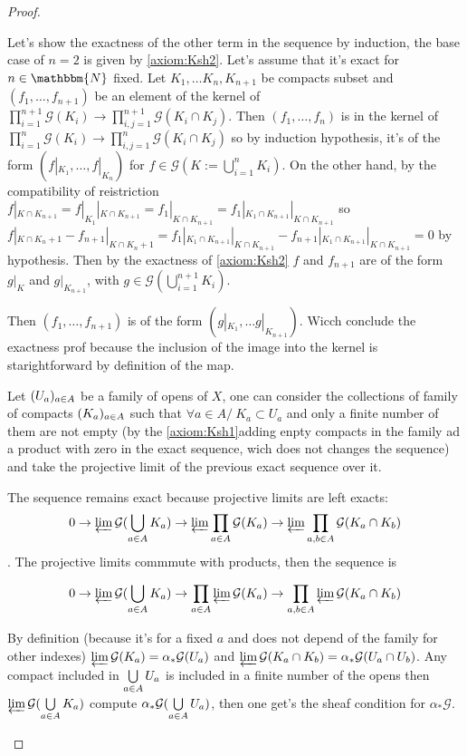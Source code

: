 \begin{proof}
\begin{itemize}
        Let's show the exactness of the other term in the sequence by induction, the base case of $n=2$ is given by \eqref{axiom:Ksh2}. Let's assume that it's exact for $n\in \mathbbm{N}$ fixed. Let $K_1,\ldots K_n, K_{n+1}$ be compacts subset and $(f_1,\ldots,f_{n+1})$ be an element of the kernel of  $\prod\limits_{i=1}^{n+1}\mathcal{G}(K_i)\to \prod\limits_{i,j=1}^{n+1}\mathcal{G}(K_i\cap K_j)$. Then $(f_1,\ldots,f_n)$ is in the kernel of $\prod\limits_{i=1}^n\mathcal{G}(K_i)\to \prod\limits_{i,j=1}^n\mathcal{G}(K_i\cap K_j)$ so by induction hypothesis, it's of the form $(f|_{K_1},\ldots,f|_{K_n})$ for $f\in \mathcal{G}(K:=\bigcup\limits_{i=1}^nK_i)$. 
        On the other hand, by the compatibility of reistriction $f|_{K\cap K_{n+1}}=f|_{K_1}|_{K\cap K_{n+1}}=f_1|_{K\cap K_{n+1}}=f_1|_{K_1\cap K_{n+1}}|_{K\cap K_{n+1}}$ so $f|_{K\cap K_n+1}-f_{n+1}|_{K\cap K_n+1}=f_1|_{K_1\cap K_{n+1}}|_{K\cap K_{n+1}}-f_{n+1}|_{K_1\cap K_{n+1}}|_{K\cap K_{n+1}}=0$ by hypothesis. Then by the exactness of \eqref{axiom:Ksh2} $f$ and $f_{n+1}$ are of the form $g|_K$ and $g|_{K_{n+1}}$, with $g\in \mathcal{G}(\bigcup\limits_{i=1}^{n+1} K_i)$.
        
        Then $(f_1,\ldots,f_{n+1})$ is of the form $(g|_{K_1},\ldots g|_{K_{n+1}})$. Wicch conclude the exactness prof because the inclusion of the image into the kernel is starightforward by definition of the map.

        Let $(U_a)_{a\in A}$ be a family of opens of $X$, one can consider the collections of family of compacts $(K_a)_{a\in A}$  such that $\forall a\in A /\ K_a\subset U_a$ and only  a finite number of them are not empty (by the \eqref{axiom:Ksh1}adding enpty compacts in the family ad a product with zero in the exact sequence, wich does not changes the sequence) and take the projective limit of the previous exact sequence over it.

        The sequence remains exact because projective limits are left exacts: \[0\to\varprojlim\mathcal{G}(\bigcup\limits_{a\in A}K_a)\to \varprojlim\prod\limits_{a\in A}\mathcal{G}(K_a)\to \varprojlim\prod\limits_{a,b\in A}\mathcal{G}(K_a\cap K_b)\]. The projective limits commmute with products, then the sequence is 

        \[0\to\varprojlim\mathcal{G}(\bigcup\limits_{a\in A}K_a)\to \prod\limits_{a\in A}\varprojlim\mathcal{G}(K_a)\to\prod\limits_{a,b\in A}\varprojlim\mathcal{G}(K_a\cap K_b)\]

        By definition (because it's for a fixed $a$ and does not depend of the family for other indexes) $\varprojlim\mathcal{G}(K_a)=\alpha_*\mathcal{G}(U_a)$ and $\varprojlim\mathcal{G}(K_a\cap K_b)=\alpha_*\mathcal{G}(U_a\cap U_b)$. Any compact included in $\bigcup\limits_{a\in A}U_a$ is included in a finite number of the opens then $\varprojlim\mathcal{G}(\bigcup\limits_{a\in A}K_a)$ compute $\alpha_*\mathcal{G}(\bigcup\limits_{a\in A}U_a)$, then one get's the sheaf condition for $\alpha_*\mathcal{G}$.


\end{itemize}
\end{proof}
